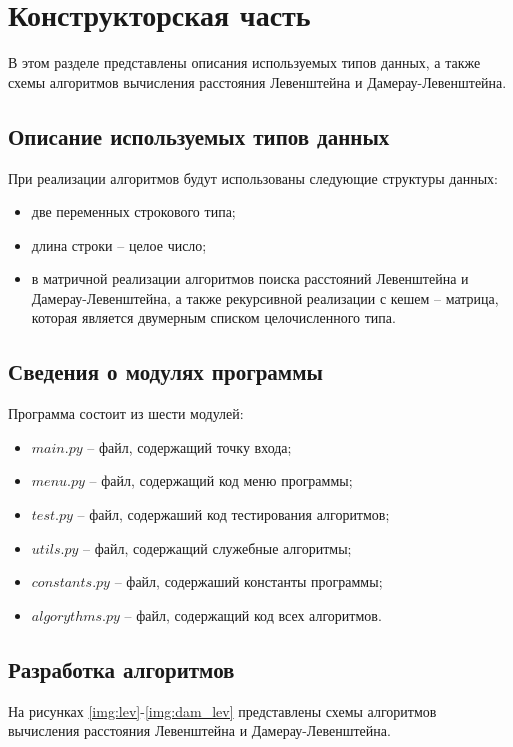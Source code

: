 \chapter{Конструкторская часть}
В этом разделе представлены описания используемых типов данных, а также схемы алгоритмов вычисления расстояния Левенштейна и Дамерау-Левенштейна.

\section{Описание используемых типов данных}
При реализации алгоритмов будут использованы следующие структуры данных:

\begin{itemize}
    \item две переменных строкового типа;
    \item длина строки -- целое число;
    \item в матричной реализации алгоритмов поиска расстояний Левенштейна и Дамерау-Левенштейна, а также рекурсивной реализации с кешем -- матрица, которая является двумерным списком целочисленного типа.
\end{itemize}


\section{Сведения о модулях программы}
Программа состоит из шести модулей:
\begin{itemize}
	\item $main.py$ -- файл, содержащий точку входа;
    \item $menu.py$ -- файл, содержащий код меню программы;
    \item $test.py$ -- файл, содержаший код тестирования алгоритмов;
    \item $utils.py$ -- файл, содержащий служебные алгоритмы;
    \item $constants.py$ -- файл, содержаший константы программы;
    \item $algorythms.py$ -- файл, содержащий код всех алгоритмов. \newline
\end{itemize}


\section{Разработка алгоритмов}
На рисунках \ref{img:lev}-\ref{img:dam_lev} представлены схемы алгоритмов вычисления расстояния Левенштейна и Дамерау-Левенштейна.

